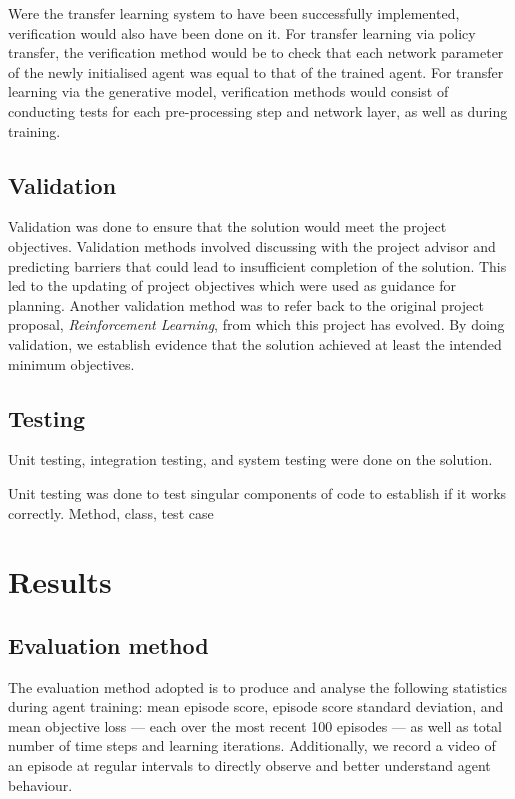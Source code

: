 \documentclass[12pt,a4paper]{article}
\begin{document}
Were the transfer learning system to have been successfully implemented, verification would also have been done on it. For transfer learning via policy transfer, the verification method would be to check that each network parameter of the newly initialised agent was equal to that of the trained agent. For transfer learning via the generative model, verification methods would consist of conducting tests for each pre-processing step and network layer, as well as during training.

\subsection{Validation}
Validation was done to ensure that the solution would meet the project objectives. Validation methods involved discussing with the project advisor and predicting barriers that could lead to insufficient completion of the solution. This led to the updating of project objectives which were used as guidance for planning. Another validation method was to refer back to the original project proposal, \textit{Reinforcement Learning}, from which this project has evolved. By doing validation, we establish evidence that the solution achieved at least the intended minimum objectives.  

\subsection{Testing}
Unit testing, integration testing, and system testing were done on the solution.

Unit testing was done to test singular components of code to establish if it works correctly. Method, class, test case

\newpage
\section{Results}
\subsection{Evaluation method}
The evaluation method adopted is to produce and analyse the following statistics during agent training: mean episode score, episode score standard deviation, and mean objective loss --- each over the most recent 100 episodes --- as well as total number of time steps and learning iterations. Additionally, we record a video of an episode at regular intervals to directly observe and better understand agent behaviour.
\end{document}
